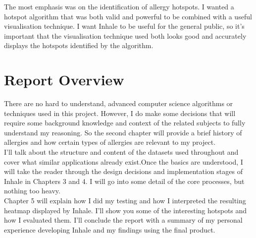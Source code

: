 The most emphasis was on the identification of allergy hotspots. I wanted a hotspot algorithm that was both valid and  powerful to be combined with a useful visualisation technique. I want Inhale to be useful for the general public, so it's important that the visualisation technique used both looks good and accurately displays the hotspots identified by the algorithm.\\


\section{Report Overview}

There are no hard to understand, advanced computer science algorithms or techniques used in this project. However, I do make some decisions that will require some background knowledge and context of the related subjects to fully understand my reasoning. So the second chapter will provide a brief history of allergies and how certain types of allergies are relevant to my project.\\

I'll talk about the structure and content of the datasets used throughout and cover what similar applications already exist.Once the basics are understood, I will take the reader through the design decisions and implementation stages of Inhale in Chapters 3 and 4. I will go into some detail of the core processes, but nothing too heavy.\\

Chapter 5 will explain how I did my testing and how I interpreted the resulting heatmap displayed by Inhale. I'll show you some of the interesting hotspots and how I evaluated them. I'll conclude the report with a summary of my personal experience developing Inhale and my findings using the final product.\\